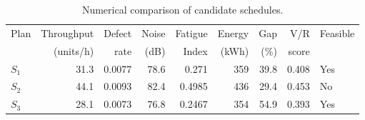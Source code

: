 \begin{table}[htbp]
\centering
\caption{Numerical comparison of candidate schedules.}
\label{tab:numerical-sim}
\small
\begin{tabular}{@{}lrrrrrrrl@{}}
\toprule
Plan & Throughput & Defect & Noise & Fatigue & Energy & Gap & V/R & Feasible \\
     & (units/h)  & rate   & (dB)  & Index   & (kWh)  & (\%) & score &         \\
\midrule
$S_{1}$ & 31.3 & 0.0077 & 78.6 & 0.271 & 359 & 39.8 & 0.408 & Yes \\
$S_{2}$ & 44.1 & 0.0093 & 82.4 & 0.4985 & 436 & 29.4 & 0.453 & No \\
$S_{3}$ & 28.1 & 0.0073 & 76.8 & 0.2467 & 354 & 54.9 & 0.393 & Yes \\
\bottomrule
\end{tabular}
\end{table}
